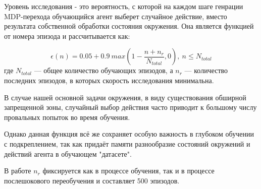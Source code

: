 Уровень исследования - это вероятность, с которой на каждом шаге генрации MDP-перехода 
обучающийся агент выберет случайное действие, вместо результата собственной обработки состояния 
окружения. 
Она является функцией от номера эпизода и рассчитывается как:

\[ \epsilon(n) = 0.05 + 0.9\ max(1 - \frac{n+n_{r}}{N_{total}}, 0),\ n \leq N_{total}\]
где $N_{total}$ — общее количество обучающих эпизодов, а $n_{r}$ — количество последних эпизодов,
в которых скорость исследования минимальна.

В случае нашей основной задачи окружения, в виду существования обширной запрещенной
зоны, случайный выбор действия часто приводит к большому числу провальных попыток во время обучения.

Однако данная функция всё же сохраняет особую важность в глубоком обучении с подкреплением, 
так как придаёт памяти разнообразие состояний окружений и действий агента в обучающем "датасете".

В работе $n_{r}$ фиксируется как в процессе обучения, так и в процессе послешокового 
переобучения и составляет 500 эпизодов.